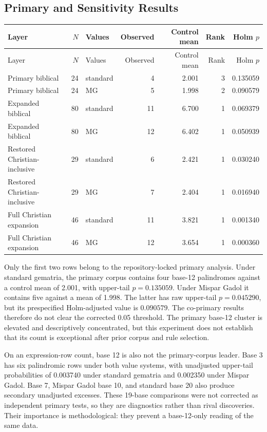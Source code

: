 \clearpage
\subsection{Primary and Sensitivity Results}

\begin{center}
\footnotesize
\begin{longtable}{>{\raggedright\arraybackslash}p{3.0cm}r>{\raggedright\arraybackslash}p{1.7cm}rrrr}
\toprule
Layer & $N$ & Values & Observed & Control mean & Rank & Holm $p$ \\
\midrule
\endfirsthead
\toprule
Layer & $N$ & Values & Observed & Control mean & Rank & Holm $p$ \\
\midrule
\endhead
Primary biblical & 24 & standard & 4 & 2.001 & 3 & 0.135059 \\
Primary biblical & 24 & MG & 5 & 1.998 & 2 & 0.090579 \\
Expanded biblical & 80 & standard & 11 & 6.700 & 1 & 0.069379 \\
Expanded biblical & 80 & MG & 12 & 6.402 & 1 & 0.050939 \\
Restored Christian-inclusive & 29 & standard & 6 & 2.421 & 1 & 0.030240 \\
Restored Christian-inclusive & 29 & MG & 7 & 2.404 & 1 & 0.016940 \\
Full Christian expansion & 46 & standard & 11 & 3.821 & 1 & 0.001340 \\
Full Christian expansion & 46 & MG & 12 & 3.654 & 1 & 0.000360 \\
\bottomrule
\end{longtable}
\end{center}

Only the first two rows belong to the repository-locked primary analysis. Under standard gematria, the primary corpus contains four base-12 palindromes against a control mean of 2.001, with upper-tail $p=0.135059$. Under Mispar Gadol it contains five against a mean of 1.998. The latter has raw upper-tail $p=0.045290$, but its prespecified Holm-adjusted value is $0.090579$. The co-primary results therefore do not clear the corrected 0.05 threshold. The primary base-12 cluster is elevated and descriptively concentrated, but this experiment does not establish that its count is exceptional after prior corpus and rule selection.

On an expression-row count, base 12 is also not the primary-corpus leader. Base 3 has six palindromic rows under both value systems, with unadjusted upper-tail probabilities of 0.003740 under standard gematria and 0.002350 under Mispar Gadol. Base 7, Mispar Gadol base 10, and standard base 20 also produce secondary unadjusted excesses. These 19-base comparisons were not corrected as independent primary tests, so they are diagnostics rather than rival discoveries. Their importance is methodological: they prevent a base-12-only reading of the same data.

